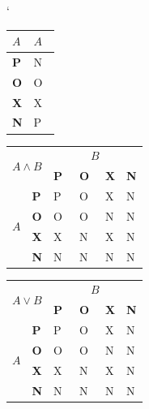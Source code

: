 \documentclass[11pt,titlepage,a4paper]{article}
\begin{document}
\begin{table}[ht]
\catcode`
\centering

\begin{tabular}{|l|l|}
\hline
$A$ & $A$  \\ 
\hline
\textbf{P} & N  \\ 
\hline
\textbf{O} & O~\\ 
\hline
\textbf{X} & X  \\ 
\hline
\textbf{N} & P  \\
\hline
\end{tabular}
\begin{tabular}{|l|l|l|l|l|l|} 
\hline
\multicolumn{2}{|l|}{\multirow{2}{*}{$A \wedge B$}}     & \multicolumn{4}{c|}{$B$}              \\ 
\cline{3-3}\cline{4-4}\cline{5-5}\cline{6-6}
\multicolumn{2}{|l|}{} & \textbf{P} & \textbf{O} & \textbf{X} & \textbf{N} \\ 
\hline
\multirow{4}{*}{$A$}                       & \textbf{P} & P                      & O~& X & N  \\ 
\cline{2-6}
                                           & \textbf{O} & O~& O~& N & N  \\ 
\cline{2-6}
                                           & \textbf{X} & X                      & N & X & N  \\ 
\cline{2-6}
                                           & \textbf{N} & N                      & N & N & N  \\
\hline
\end{tabular}
\begin{tabular}{|l|l|l|l|l|l|} 
\hline
\multicolumn{2}{|l|}{\multirow{2}{*}{$A \vee B$}}     & \multicolumn{4}{c|}{$B$}              \\ 
\cline{3-3}\cline{4-4}\cline{5-5}\cline{6-6}
\multicolumn{2}{|l|}{} & \textbf{P} & \textbf{O} & \textbf{X} & \textbf{N}  \\ 
\hline
\multirow{4}{*}{$A$}                       & \textbf{P} & P                      & O~& X & N  \\ 
\cline{2-6}
                                           & \textbf{O} & O~& O~& N & N  \\ 
\cline{2-6}
                                           & \textbf{X} & X                      & N & X & N  \\ 
\cline{2-6}
                                           & \textbf{N} & N                      & N & N & N  \\
\hline
\end{tabular}

\end{table}
\end{document}
